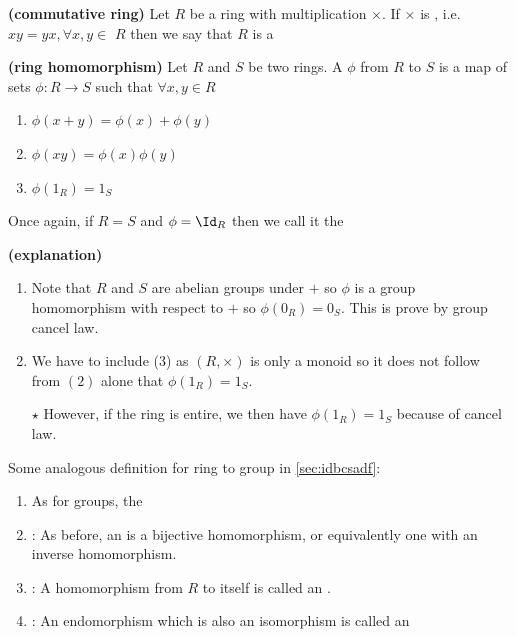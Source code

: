 \documentclass{article}
\newcommand{\bfs}[1]{\textbf{({#1}) }}
\begin{document}
\begin{defa}\bfs{commutative ring}
  Let $R$ be a ring with multiplication $\times$. If $\times$ is , i.e. $x y=y x, \forall x, y \in$ $R$ then we say that $R$ is a 
\end{defa}

\begin{defa}\bfs{ring homomorphism}\label{def:donacca}
  Let $R$ and $S$ be two rings. A  $\phi$ from $R$ to $S$ is a map of sets $\phi: R \rightarrow S$ such that $\forall x, y \in R$
  \begin{enumerate}
      \item $\phi(x+y)=\phi(x)+\phi(y)$
      \item $\phi(x y)=\phi(x) \phi(y)$
      \item $\phi\left(1_{R}\right)=1_{S}$
  \end{enumerate}
\end{defa}
\begin{rema}
Once again, if $R=S$ and $\phi=\Id_{R}$ then we call it the 
\end{rema}
\begin{rema}\bfs{explanation}
\begin{enumerate}
    \item Note that $R$ and $S$ are abelian groups under $+$ so $\phi$ is a group homomorphism with respect to $+$ so $\phi\left(0_{R}\right)=0_{S}$. This is prove by group cancel law. 
    \item We have to include (3) as $(R, \times)$ is only a monoid so it does not follow from $(2)$ alone that $\phi\left(1_{R}\right)=1_{S}$.
    
    $\star$ However, if the ring is entire, we then have $\phi\left(1_{R}\right)=1_{S}$ because of cancel law.
\end{enumerate}
\end{rema}
\begin{defa}Some analogous definition for ring to group in \cref{sec:idbcsadf}:
  \begin{enumerate}
    \item As for groups, the 
    \item {}: As before, an  is a bijective homomorphism, or equivalently one with an inverse homomorphism.
    \item {}: A homomorphism from $R$ to itself is called an . 
    \item {}: An endomorphism which is also an isomorphism is called an  
\end{enumerate}
\end{defa}
\end{document}
